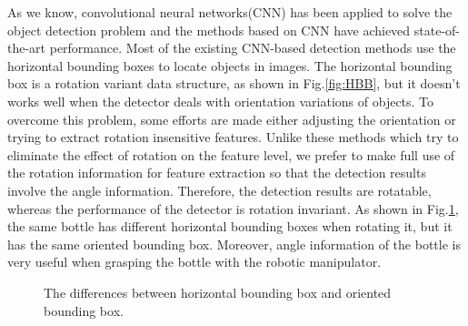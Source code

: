 As we know, convolutional neural networks(CNN) has been applied to solve the object detection problem and the methods based on CNN have achieved state-of-the-art performance\cite{DRBox}. Most of the existing CNN-based detection methods use the horizontal bounding boxes to locate objects in images. The horizontal bounding box is a rotation variant data structure, as shown in Fig.\ref{fig:HBB}, but it doesn't works well when the detector deals with orientation variations of objects. To overcome this problem, some efforts are made either adjusting the orientation or trying to extract rotation insensitive features. Unlike these methods which try to eliminate the effect of rotation on the feature level, we prefer to make full use of the rotation information for feature extraction so that the detection results involve the angle information. Therefore, the detection results are rotatable, whereas the performance of the detector is rotation invariant\cite{DRBox}. As shown in Fig.\ref{fig:HBB_and_OBB}, the same bottle has different horizontal bounding boxes when rotating it, but it has the same oriented bounding box. Moreover, angle information of the bottle is very useful when grasping the bottle with the robotic manipulator.

\begin{figure}
	\centering
	
	\caption{The differences between horizontal bounding box and oriented bounding box.}
	\label{fig:HBB_and_OBB}
\end{figure}